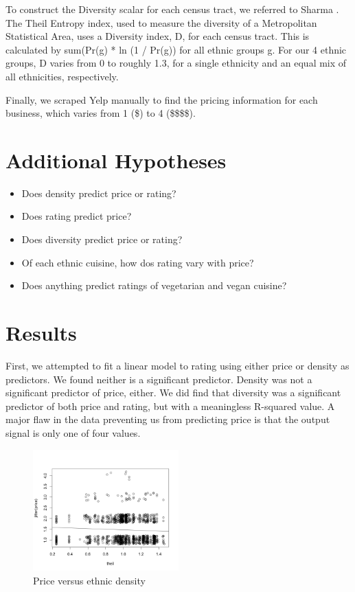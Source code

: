 \documentclass[11pt,twocolumn]{article}
\begin{document}
To construct the Diversity scalar for each census tract, we referred to Sharma \cite{tindex}. The Theil Entropy index, used to measure the diversity of a Metropolitan Statistical Area, uses a Diversity index, D, for each census tract. This is calculated by sum(Pr(g) * ln (1 / Pr(g)) for all ethnic groups g. For our 4 ethnic groups, D varies from 0 to roughly 1.3, for a single ethnicity and an equal mix of all ethnicities, respectively.

Finally, we scraped Yelp manually to find the pricing information for each business, which varies from 1 (\$) to 4 (\$\$\$\$).

\section{Additional Hypotheses}
\begin{itemize}
\item Does density predict price or rating?
\item Does rating predict price?
\item Does diversity predict price or rating?
\item Of each ethnic cuisine, how dos rating vary with price?
\item Does anything predict ratings of vegetarian and vegan cuisine?
\end{itemize}
\section{Results}

First, we attempted to fit a linear model to rating using either price or density as predictors. We found neither is a significant predictor. Density was not a significant predictor of price, either. We did find that diversity was a significant predictor of both price and rating, but with a meaningless R-squared value.  A major flaw in the data preventing us from predicting price is that the output signal is only one of four values.

\begin{figure}[h!]
  \caption{Price versus ethnic density}
  \centering
  \includegraphics[width=0.5\textwidth]{diversity_price}
\end{figure}
\end{document}
